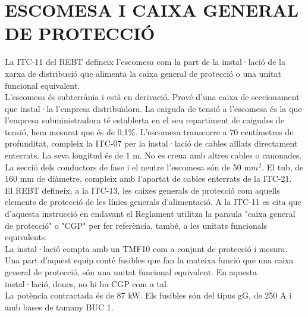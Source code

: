 \chapter{\uppercase{Escomesa i caixa general de protecció}}
La ITC-11 del REBT defineix l'escomesa com la part de la instal·lació de la xarxa de distribució que alimenta la caixa general de protecció o una unitat funcional equivalent.\\
\newline L'escomesa és subterrània i està en derivació. Prové d'una caixa de seccionament que instal·la l'empresa distribuïdora. La caiguda de tensió a l'escomesa és la que l'empresa subministradora té establerta en el seu repartiment de caigudes de tensió, hem mesurat que és de 0,1\%. L'escomesa transcorre a 70 centímetres de profunditat, compleix la ITC-07 per la instal·lació de cables aïllats directament enterrats. La seva longitud és de 1 m. No es creua amb altres cables o canonades. La secció dels conductors de fase i el neutre l'escomesa són de 50 m$m^2$. El tub, de 160 mm de diàmetre, compleix amb l'apartat de cables enterrats de la ITC-21.\\
\newline
El REBT defineix, a la ITC-13, les caixes generals de protecció com aquells elements de protecció de les línies generals d'alimentació. A la ITC-11 es cita que d'aquesta instrucció en endavant el Reglament utilitza la paraula "caixa general de protecció" o "CGP" per fer referència, també, a les unitats funcionals equivalents.\\
\newline 
La instal·lació compta amb un TMF10 com a conjunt de protecció i mesura. Una part d'aquest equip conté fusibles que fan la mateixa funció que una caixa general de protecció, són una unitat funcional equivalent. En aquesta instal·lació, doncs, no hi ha CGP com a tal.\\
\newline La potència contractada és de 87 kW. Els fusibles són del tipus gG, de 250 A i amb bases de tamany BUC 1.

\clearpage